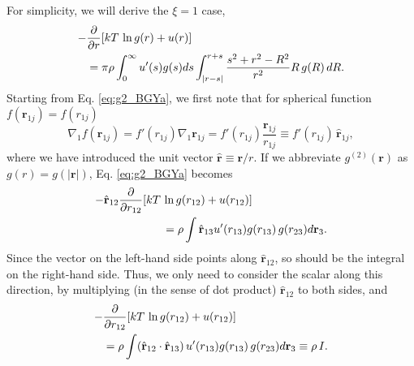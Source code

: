 \documentclass[twocolumn, 10pt]{article}
\numberwithin{equation}{section}
\newenvironment{solution}[1][\empty]
{\par\medskip\sffamily
  \textbf{\ifx\empty#1{Solution.}\relax\else{#1}\fi} \ignorespaces}
{\medskip}
\begin{document}
\begin{solution}
  For simplicity, we will derive the $\xi = 1$ case,
  \begin{align}
    -&\frac{\partial}{\partial r}
    [kT \, \ln g(r) + u(r)]
    \notag
    \\
    &=
    \pi\rho\int_0^\infty u'(s) g(s) ds
    \int_{|r-s|}^{r+s}
    \frac{ s^2 + r^2 - R^2 }{ r^2 }
    R \,  g(R) \, dR.
   \label{eq:g2_BGYb}
  \end{align}
  Starting from Eq. \eqref{eq:g2_BGYa},
  we first note that for spherical function $f(\mathbf r_{1j}) = f(r_{1j})$
  $$
  \nabla_1 f(\mathbf r_{1j})
  = f'(r_{1j}) \nabla_1 \mathbf r_{1j}
  = f'(r_{1j}) \frac{ \mathbf r_{1j} } { r_{1j} }
  \equiv f'(r_{1j}) \, \hat{\mathbf r}_{1j}
  ,
  $$
  where we have introduced the unit vector
  $\hat{\mathbf r} \equiv \mathbf r/r$.
%
If we abbreviate $g^{(2)}(\mathbf r)$ as $g(r) = g(|\mathbf r|)$,
Eq. \eqref{eq:g2_BGYa} becomes
\begin{align*}
  -\hat{ \mathbf r}_{12}
  \frac{\partial }{\partial r_{12} }[kT \, & \ln g(r_{12}) + u(r_{12})]
  \notag
  \\
  &=
  \rho
  \int
    \hat{ \mathbf r}_{13}
    u'(r_{13})
    g(r_{13}) \,
    g(r_{23})
    d\mathbf r_3
  .
\end{align*}
Since the vector on the left-hand side points along $\hat{\mathbf r}_{12}$,
so should be the integral on the right-hand side.
%
Thus, we only need to consider the scalar along this direction,
by multiplying (in the sense of dot product) $\hat{\mathbf r}_{12}$
to both sides, and
\begin{align}
  -&\frac{\partial }{\partial r_{12} }[kT \, \ln g(r_{12}) + u(r_{12})]
  \notag
  \\
  &=
  \rho
  \int
    (\hat{\mathbf r}_{12} \cdot \hat{ \mathbf r}_{13}) \,
    u'(r_{13})
    g(r_{13}) \,
    g(r_{23})
    d\mathbf r_3
  \equiv
  \rho \, I
  .
  \label{eq:g2_BGYc}
\end{align}

\begin{figure}[h]
\end{figure}



\end{solution}
\end{document}
